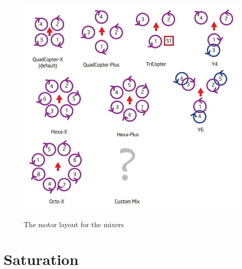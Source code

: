 \documentclass[paper=a4, fontsize=11pt]{scrartcl} %
\begin{document}
\begin{figure}[h]
	\centering
	\includegraphics[scale=0.3]{fig/motor_layout.jpg}
	\label{fig:motor_layout}
	\caption{The motor layout for the mixers}
\end{figure}

\section{Saturation}
\end{document}
